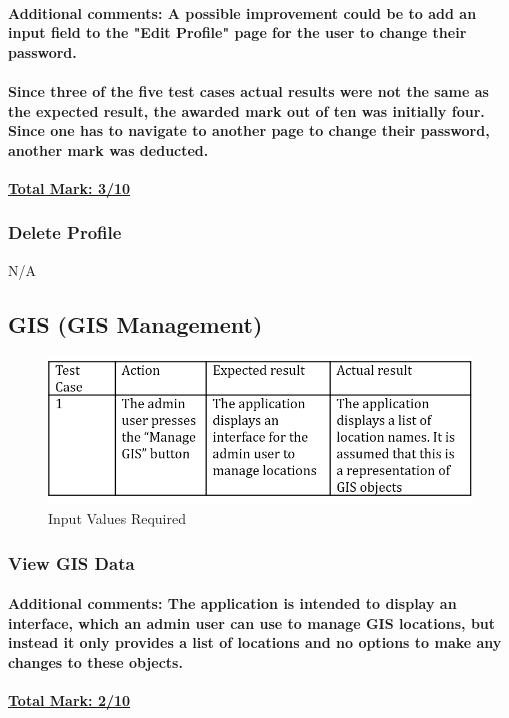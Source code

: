 \documentclass[english]{article}
\begin{document}
\paragraph{Additional comments: \newline A possible improvement could be to add an input field to the "Edit Profile" page for the user to change their password.}

\paragraph{Since three of the five test cases actual results were not the same as the expected result, the awarded mark out of ten was initially four. Since one has to navigate to another page to change their password, another mark was deducted. \newline}
\textbf{\underline{Total Mark: 3/10}}

\subsubsection{Delete Profile}
N/A

\subsection{GIS (GIS Management)}

\begin{figure}[H]
\centering
\includegraphics[width=1.0\textwidth]{8.1}
\caption{Input Values Required}
\end{figure}


\subsubsection{View GIS Data}


\paragraph{Additional comments: \newline The application is intended to display an interface, which an admin user can use to manage GIS locations, but instead it only provides a list of locations and no options to make any changes to these objects. \newline}
\textbf{\underline{Total Mark: 2/10}}
\end{document}
